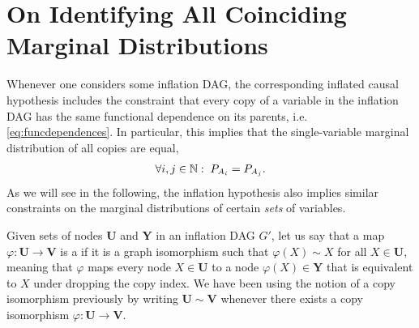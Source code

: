 \section{On Identifying All Coinciding Marginal Distributions}\label{sec:coincidingdetails}



Whenever one considers some inflation DAG, the corresponding inflated causal hypothesis includes the constraint that every copy of a variable in the inflation DAG has the same functional dependence on its parents, i.e. \cref{eq:funcdependences}. In particular, this implies that the single-variable marginal distribution of all copies are equal,
\begin{align}
     \forall i,j \in \mathbb{N}:\; P_{A_i}=P_{A_j}.
\end{align}
As we will see in the following, the inflation hypothesis also implies similar constraints on the marginal distributions of certain \emph{sets} of variables.

Given sets of nodes $\bm{U}$ and $\bm{Y}$ in an inflation DAG $G'$, let us say that a map $\varphi:\bm{U}\to\bm{V}$ is a  if it is a graph isomorphism such that $\varphi(X)\sim X$ for all $X\in\bm{U}$, meaning that $\varphi$ maps every node $X\in\bm{U}$ to a node $\varphi(X)\in\bm{Y}$ that is equivalent to $X$ under dropping the copy index. We have been using the notion of a copy isomorphism previously by writing $\bm{U}\sim\bm{V}$ whenever there exists a copy isomorphism $\varphi:\bm{U}\to\bm{V}$.

